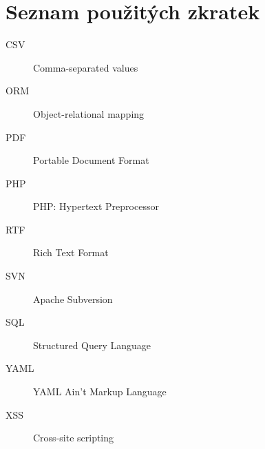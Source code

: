 \documentclass[thesis=B,czech]{FITthesis}[2011/06/14]
\begin{document}



\appendix

\chapter{Seznam použitých zkratek}
\begin{description}
	\item[CSV] Comma-separated values
	\item[ORM] Object-relational mapping
	\item[PDF] Portable Document Format
	\item[PHP] PHP: Hypertext Preprocessor
	\item[RTF] Rich Text Format
	\item[SVN] Apache Subversion
	\item[SQL] Structured Query Language
	\item[YAML] YAML Ain't Markup Language
	\item[XSS] Cross-site scripting
\end{description}


% 
% 
% 
\end{document}
